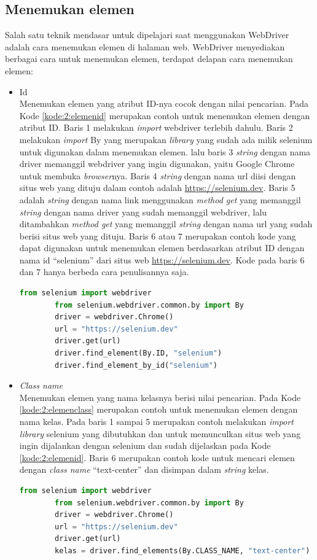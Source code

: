 \subsection{Menemukan elemen}
Salah satu teknik mendasar untuk dipelajari saat menggunakan WebDriver adalah cara menemukan elemen di halaman web. WebDriver menyediakan berbagai cara untuk menemukan elemen, terdapat delapan cara menemukan elemen:
\begin{itemize}
	\item Id \\
	Menemukan elemen yang atribut ID-nya cocok dengan nilai pencarian. Pada Kode \ref{kode:2:elemenid} merupakan contoh untuk menemukan elemen dengan atribut ID. Baris 1 melakukan \textit{import} webdriver terlebih dahulu. Baris 2 melakukan \textit{import} By yang merupakan \textit{library} yang sudah ada milik selenium untuk digunakan dalam menemukan elemen. lalu baris 3 \textit{string} dengan nama driver memanggil webdriver yang ingin digunakan, yaitu Google Chrome untuk membuka \textit{browser}nya. Baris 4 \textit{string} dengan nama url diisi dengan situs web yang dituju dalam contoh adalah \url{https://selenium.dev}. Baris 5 adalah \textit{string} dengan nama link menggunakan \textit{method get} yang memanggil \textit{string} dengan nama driver yang sudah memanggil webdriver, lalu ditambahkan \textit{method get} yang memanggil \textit{string} dengan nama url yang sudah berisi situs web yang dituju. Baris 6 atau 7 merupakan contoh kode yang dapat digunakan untuk menemukan elemen berdasarkan atribut ID dengan nama id ``selenium'' dari situs web \url{https://selenium.dev}. Kode pada baris 6 dan 7 hanya berbeda cara penulisannya saja. 
	\begin{lstlisting}[language=python, caption=Contoh kode untuk menemukan elemen dengan atribut ID, label=kode:2:elemenid]
		from selenium import webdriver
		from selenium.webdriver.common.by import By
		driver = webdriver.Chrome()
		url = "https://selenium.dev"
		driver.get(url)
		driver.find_element(By.ID, "selenium")	
		driver.find_element_by_id("selenium")
	\end{lstlisting}
	
	\item \textit{Class name}\\
	Menemukan elemen yang nama kelasnya berisi nilai pencarian. Pada Kode \ref{kode:2:elemenclass} merupakan contoh untuk menemukan elemen dengan nama kelas. Pada baris 1 sampai 5 merupakan contoh melakukan \textit{import library} selenium yang dibutuhkan dan untuk memunculkan situs web yang ingin dijalankan dengan selenium dan sudah dijelaskan pada Kode \ref{kode:2:elemenid}. Baris 6 merupakan contoh kode untuk mencari elemen dengan \textit{class name} ``text-center'' dan disimpan dalam \textit{string} kelas.
	\begin{lstlisting}[language=python, caption=Contoh kode untuk menemukan elemen dengan \textit{class name}, label=kode:2:elemenclass]
		from selenium import webdriver
		from selenium.webdriver.common.by import By
		driver = webdriver.Chrome()
		url = "https://selenium.dev"
		driver.get(url)
		kelas = driver.find_elements(By.CLASS_NAME, "text-center")
	\end{lstlisting}
	

\end{itemize}
